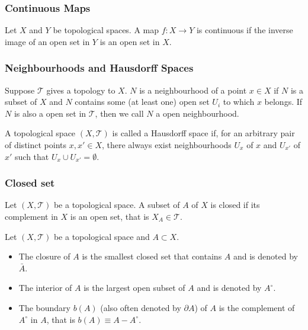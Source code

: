 \documentclass[10pt]{article}
\begin{document}
\subsubsection{Continuous Maps}
\begin{definition}
    Let $X$ and $Y$ be topological spaces.
    A map $f:X\to Y$ is continuous if the inverse image of an open set in $Y$ is an open set in $X$.
\end{definition}

\subsubsection{Neighbourhoods and Hausdorff Spaces}
\begin{definition}[Neighbourhood]
    Suppose $\mathcal{T}$ gives a topology to $X$.
    $N$ is a neighbourhood of a point $x\in X$ if $N$ is a subset of $X$ and $N$ contains some (at least one) open set $U_i$ to which $x$ belongs.
    If $N$ is also a open set in $\mathcal{T}$, then we call $N$ a open neighbourhood.
\end{definition}

\begin{definition}[Hausdorff]
    A topological space $(X,\mathcal{T})$ is called a Hausdorff space if, for an arbitrary pair of distinct points $x,x'\in X$, there always exist neighbourhoods $U_x$ of $x$ and $U_{x'}$ of $x'$ such that $U_x\cup U_{x'}=\emptyset$.
\end{definition}

\subsubsection{Closed set}
\begin{definition}
    Let $(X,\mathcal{T})$ be a topological space.
    A subset of $A$ of $X$ is closed if its complement in $X$ is an open set, that is $X_A\in\mathcal{T}$.
\end{definition}

\begin{definition}
    Let $(X,\mathcal{T})$ be a topological space and $A\subset X$.
    \begin{itemize}
        \item The closure of $A$ is the smallest closed set that contains $A$ and is denoted by $\bar{A}$.
        \item The interior of $A$ is the largest open subset of $A$ and is denoted by $A^\circ$.
        \item The boundary $b(A)$ (also often denoted by $\partial A$) of $A$ is the complement of $A^\circ$ in $A$, that is $b(A)\equiv A-A^\circ$.
    \end{itemize}
\end{definition}
\end{document}
